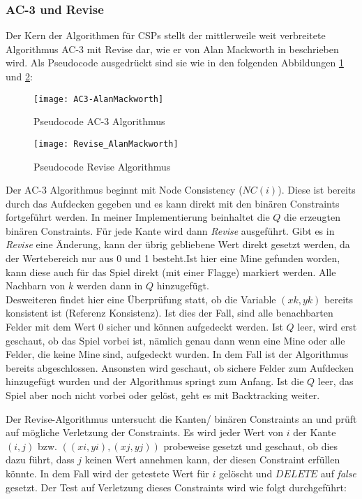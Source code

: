\subsubsection{AC-3 und Revise}

Der Kern der Algorithmen für CSPs stellt der mittlerweile weit verbreitete Algorithmus AC-3 mit Revise dar, wie er von Alan Mackworth in 
\cite{Alan} beschrieben wird. Als Pseudocode ausgedrückt sind sie wie in den folgenden Abbildungen \ref{AC3} und \ref{Revise}:

\begin{figure}[!htb]
    \centering
    \texttt{[image: AC3-AlanMackworth]}
    \caption{Pseudocode AC-3 Algorithmus}\label{AC3}
\end{figure}
\begin{figure}[!htb]
    \centering
    \texttt{[image: Revise\_AlanMackworth]}
    \caption{Pseudocode Revise Algorithmus}\label{Revise}
\end{figure}

Der AC-3 Algorithmus beginnt mit Node Consistency ($NC(i)$). Diese ist bereits durch das Aufdecken gegeben und es kann direkt mit den
binären Constraints fortgeführt werden. In meiner Implementierung beinhaltet die $Q$ die erzeugten binären Constraints. Für jede Kante wird
dann \textit{Revise} ausgeführt.
Gibt es in \textit{Revise} eine Änderung, kann der übrig gebliebene Wert direkt gesetzt werden, da der 
Wertebereich nur aus 0 und 1 besteht.\clearpage Ist hier eine Mine gefunden worden, kann diese auch für das Spiel direkt (mit einer Flagge) markiert
werden. Alle Nachbarn von $k$ werden dann in $Q$ hinzugefügt.\\ Desweiteren findet hier eine Überprüfung statt, ob die Variable $(xk, yk)$ bereits
konsistent ist (Referenz Konsistenz). Ist dies der Fall, sind alle benachbarten Felder mit dem Wert 0 sicher und können aufgedeckt werden.
Ist $Q$ leer, wird erst geschaut, ob das Spiel vorbei ist, nämlich genau dann wenn eine Mine oder alle Felder, die keine Mine sind, aufgedeckt
wurden. In dem Fall ist der Algorithmus bereits abgeschlossen. Ansonsten wird geschaut, ob sichere Felder zum Aufdecken hinzugefügt wurden
und der Algorithmus springt zum Anfang. Ist die $Q$ leer, das Spiel aber noch nicht vorbei oder gelöst, geht es mit Backtracking weiter.

Der Revise-Algorithmus untersucht die Kanten/ binären Constraints an und prüft auf mögliche Verletzung der Constraints. Es wird jeder Wert
von $i$ der Kante $(i,j)$ bzw. $((xi, yi), (xj, yj))$ probeweise gesetzt und geschaut, ob dies dazu führt, dass $j$ keinen Wert annehmen kann,
der diesen Constraint erfüllen könnte. In dem Fall wird der getestete Wert für $i$ gelöscht und $DELETE$ auf \textit{false} gesetzt. Der Test
auf Verletzung dieses Constraints wird wie folgt durchgeführt:

